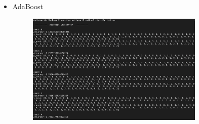 \begin{itemize}
\begin{figure}[H]
	\end{figure}
	\item AdaBoost\\
	\begin{figure}[H]
		\centering
		\includegraphics[width=0.8\textwidth]{pic/Adaboost.png}
	\end{figure}
\end{itemize}

